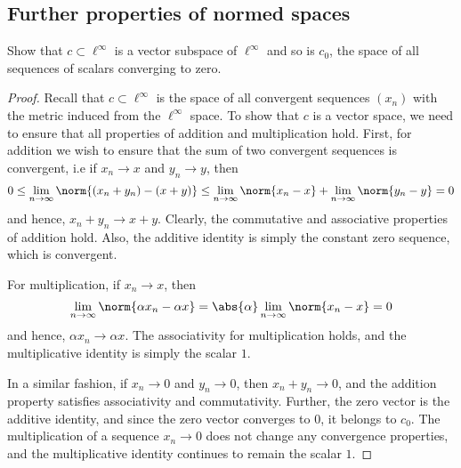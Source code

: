 \subsection{Further properties of normed spaces}

\begin{question}
    Show that $c \subset \ell^\infty$ is a vector subspace of $\ell^\infty$ and so is $c_0$, the space of all sequences of scalars converging to zero.
    \label{section2.3-1}
\end{question}
\begin{proof}
    Recall that $c \subset \ell^\infty$ is the space of all convergent sequences $(x_n)$ with the metric induced from the $\ell^\infty$ space. To show that $c$ is a vector space, we need to ensure that all properties of addition and multiplication hold. First, for addition we wish to ensure that the sum of two convergent sequences is convergent, i.e if $x_n \rightarrow x$ and $y_n \rightarrow y$, then
    \[0 \leq \lim_{n \rightarrow \infty}\norm{(x_n + y_n) - (x+y)} \leq \lim_{n \rightarrow \infty} \norm{x_n -x} + \lim_{n \rightarrow \infty} \norm{y_n - y} = 0\]
    and hence, $x_n + y_n \rightarrow x + y$. Clearly, the commutative and associative properties of addition hold. Also, the additive identity is simply the constant zero sequence, which is convergent.

    For multiplication, if $x_n \rightarrow x$, then
    \[\lim_{n \rightarrow \infty} \norm{\alpha x_n - \alpha x} = \abs{\alpha} \lim_{n \rightarrow \infty} \norm{x_n -x} = 0\]
    and hence, $\alpha x_n \rightarrow \alpha x$. The associativity for multiplication holds, and the multiplicative identity is simply the scalar $1$.
    
    In a similar fashion, if $x_n \rightarrow 0$ and $y_n \rightarrow 0$, then $x_n + y_n \rightarrow 0$, and the addition property satisfies associativity and commutativity. Further, the zero vector is the additive identity, and since the zero  vector converges to $0$, it belongs to $c_0$. The multiplication of a sequence $x_n \rightarrow 0$ does not change any convergence properties, and the multiplicative identity continues to remain the scalar $1$. 
\end{proof}

